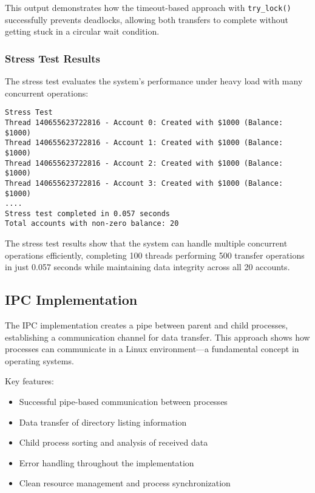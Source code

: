 \documentclass[12pt]{article}
\begin{document}
This output demonstrates how the timeout-based approach with \texttt{try\_lock()} successfully prevents deadlocks, allowing both transfers to complete without getting stuck in a circular wait condition.

\subsubsection{Stress Test Results}
The stress test evaluates the system's performance under heavy load with many concurrent operations:

\begin{lstlisting}[style=consolestyle, caption=Sample Output: Stress Test]
Stress Test
Thread 140655623722816 - Account 0: Created with $1000 (Balance: $1000)
Thread 140655623722816 - Account 1: Created with $1000 (Balance: $1000)
Thread 140655623722816 - Account 2: Created with $1000 (Balance: $1000)
Thread 140655623722816 - Account 3: Created with $1000 (Balance: $1000)
....
Stress test completed in 0.057 seconds
Total accounts with non-zero balance: 20
\end{lstlisting}

The stress test results show that the system can handle multiple concurrent operations efficiently, completing 100 threads performing 500 transfer operations in just 0.057 seconds while maintaining data integrity across all 20 accounts.


\subsection{IPC Implementation}
The IPC implementation creates a pipe between parent and child processes, establishing a communication channel for data transfer. This approach shows how processes can communicate in a Linux environment—a fundamental concept in operating systems.

Key features:
\begin{itemize}
    \item Successful pipe-based communication between processes
    \item Data transfer of directory listing information
    \item Child process sorting and analysis of received data
    \item Error handling throughout the implementation
    \item Clean resource management and process synchronization
\end{itemize}
\end{document}
